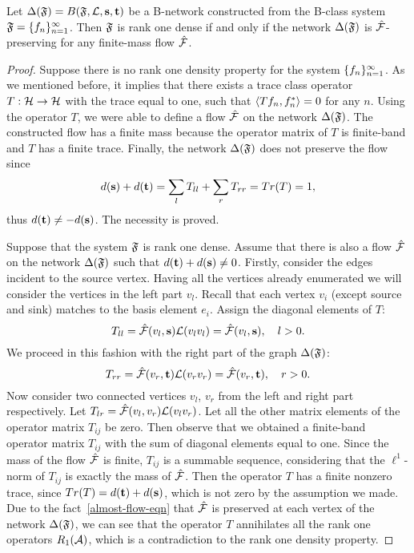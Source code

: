 \documentclass[12pt]{amsart}
\begin{document}
    \begin{theorem}
      \label{thm-graph-eq}
        Let $\net(\fsys) = B(\fsys, \len, \source, \sink)$ be a B-network constructed
          from the B-class system $\fsys = \seq{f}$.
        Then $\fsys$ is rank one dense if and only if
          the network $\net(\fsys)$ is $\flow$-preserving for any finite-mass flow $\flow$.
    \end{theorem}
    \begin{proof}
      Suppose there is no rank one density property for the system $\seq{f}$.
      As we mentioned before, it implies that there exists a trace class operator $T: \cal{H} \to \cal{H}$ with
        the trace equal to one, such that $\inner{Tf_n}{f_n^*} = 0$ for any $n$.
      Using the operator $T$, we were able to define a flow $\flow$ on the network $\net(\fsys)$.
      The constructed flow has a finite mass because the operator matrix of $T$ is finite-band and $T$ has a finite trace.
      Finally, the network $\net(\fsys)$ does not preserve the flow since
      \[
        d(\source) + d(\sink) = \sum_{l} T_{ll} + \sum_{r} T_{rr} = Tr(T) = 1,
      \]
      thus $d(\sink) \neq -d(\source)$.
      The necessity is proved.

      Suppose that the system $\fsys$ is rank one dense.
      Assume that there is also a flow $\flow$ on the network $\net(\fsys)$ such that $d(\sink) + d(\source) \neq 0$.
      Firstly, consider the edges incident to the source vertex.
      Having all the vertices already enumerated we will consider the vertices in the left part $v_{l}$.
      Recall that each vertex $v_i$ (except source and sink) matches to the basis element $e_i$.
      Assign the diagonal elements of $T$:
      \[
        T_{ll} = \flow(v_l, \source) \len(v_l v_l) = \flow(v_l, \source), \quad l > 0.
      \]
      We proceed in this fashion with the right part of the graph $\net(\fsys)$:
      \[
        T_{rr} = \flow(v_r, \sink) \len(v_r v_r) = \flow(v_r, \sink), \quad r > 0.
      \]
      Now consider two connected vertices $v_l$, $v_r$ from the left and right part respectively.
      Let $T_{lr} = \flow(v_l, v_r) \len(v_l  v_r)$.
      Let all the other matrix elements of the operator matrix $T_{ij}$ be zero.
      Then observe that we obtained a finite-band operator matrix $T_{ij}$ with the sum of diagonal elements equal to one.
      Since the mass of the flow $\flow$ is finite, $T_{ij}$ is a summable sequence, considering that
        the $\ell^1$-norm of $T_{ij}$ is exactly the mass of $\flow$.
      Then the operator $T$ has a finite nonzero trace, since $Tr(T) = d(\sink) + d(\source)$, which is not zero
        by the assumption we made.
      Due to the fact~\eqref{almost-flow-eqn} that $\flow$ is preserved at each vertex of the network $\net(\fsys)$,
        we can see that the operator $T$ annihilates all the rank one operators $R_1(\cal{A})$,
        which is a contradiction to the rank one density property.
    \end{proof}
\end{document}
